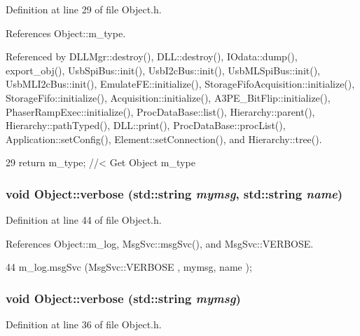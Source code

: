 Definition at line 29 of file Object.h.

References Object::m\_\-type.

Referenced by DLLMgr::destroy(), DLL::destroy(), IOdata::dump(), export\_\-obj(), UsbSpiBus::init(), UsbI2cBus::init(), UsbMLSpiBus::init(), UsbMLI2cBus::init(), EmulateFE::initialize(), StorageFifoAcquisition::initialize(), StorageFifo::initialize(), Acquisition::initialize(), A3PE\_\-BitFlip::initialize(), PhaserRampExec::initialize(), ProcDataBase::list(), Hierarchy::parent(), Hierarchy::pathTyped(), DLL::print(), ProcDataBase::procList(), Application::setConfig(), Element::setConnection(), and Hierarchy::tree().


\begin{DoxyCode}
29 { return m_type;       } //< Get Object m_type
\end{DoxyCode}
\hypertarget{classObject_a2d4120195317e2a3c6532e8bb9f3da68}{
\subsubsection[{verbose}]{\setlength{\rightskip}{0pt plus 5cm}void Object::verbose (std::string {\em mymsg}, \/  std::string {\em name})}}
\label{classObject_a2d4120195317e2a3c6532e8bb9f3da68}


Definition at line 44 of file Object.h.

References Object::m\_\-log, MsgSvc::msgSvc(), and MsgSvc::VERBOSE.


\begin{DoxyCode}
44 { m_log.msgSvc (MsgSvc::VERBOSE , mymsg, name ); }
\end{DoxyCode}
\hypertarget{classObject_a83d2db2df682907ea1115ad721c1c4a1}{
\subsubsection[{verbose}]{\setlength{\rightskip}{0pt plus 5cm}void Object::verbose (std::string {\em mymsg})}}
\label{classObject_a83d2db2df682907ea1115ad721c1c4a1}


Definition at line 36 of file Object.h.

